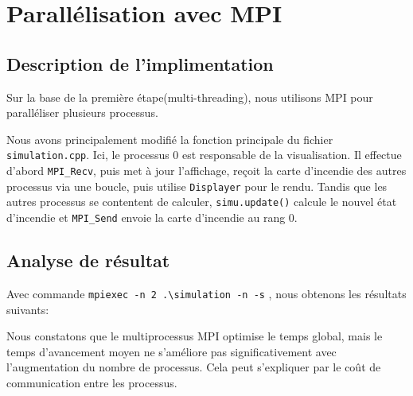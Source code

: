\chapter{Parallélisation avec MPI}
\section{Description de l'implimentation}
Sur la base de la première étape(multi-threading), nous utilisons MPI pour paralléliser plusieurs processus.
\par
Nous avons principalement modifié la fonction principale du fichier \texttt{simulation.cpp}. 
Ici, le processus 0 est responsable de la visualisation. 
Il effectue d'abord \texttt{MPI\_Recv}, puis met à jour l'affichage, reçoit la carte d'incendie des autres processus via une boucle, puis utilise \texttt{Displayer} pour le rendu. 
Tandis que les autres processus se contentent de calculer, \texttt{simu.update()} calcule le nouvel état d'incendie et \texttt{MPI\_Send} envoie la carte d'incendie au rang 0.
\section{Analyse de résultat}
Avec commande \texttt{mpiexec -n 2 .\textbackslash simulation -n -s} , nous obtenons les résultats suivants:
\begin{table}[h]
    \centering
    \caption{Résultat de la parallélisation avec MPI en cas de 4 threads}
    \label{tab:mytable}
\end{table}
\par
Nous constatons que le multiprocessus MPI optimise le temps global, mais le temps d'avancement moyen ne s'améliore pas significativement avec l'augmentation du nombre de processus. Cela peut s'expliquer par le coût de communication entre les processus.
